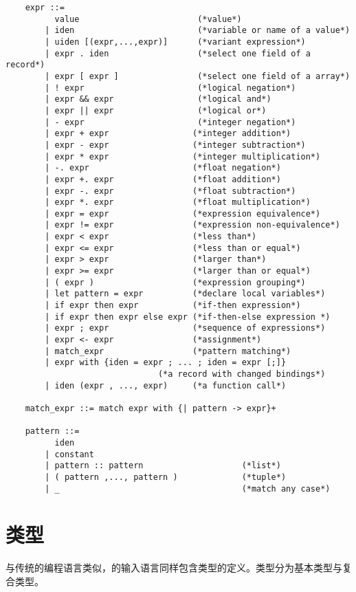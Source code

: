 \begin{center}
	\begin{verbatim}
	expr ::=
	      value                        (*value*)
	    | iden                         (*variable or name of a value*)
	    | uiden [(expr,...,expr)]      (*variant expression*)
	    | expr . iden                  (*select one field of a record*)
	    | expr [ expr ]                (*select one field of a array*)
	    | ! expr                       (*logical negation*)
	    | expr && expr                 (*logical and*)
	    | expr || expr                 (*logical or*)
	    | - expr                       (*integer negation*)
	    | expr + expr                 (*integer addition*)
	    | expr - expr                 (*integer subtraction*)
	    | expr * expr                 (*integer multiplication*)
	    | -. expr                     (*float negation*)
	    | expr +. expr                (*float addition*)
	    | expr -. expr                (*float subtraction*)
	    | expr *. expr                (*float multiplication*)
	    | expr = expr                 (*expression equivalence*)
	    | expr != expr                (*expression non-equivalence*)
	    | expr < expr                 (*less than*)
	    | expr <= expr                (*less than or equal*)
	    | expr > expr                 (*larger than*)
	    | expr >= expr                (*larger than or equal*)
	    | ( expr )                    (*expression grouping*)
	    | let pattern = expr          (*declare local variables*)
	    | if expr then expr           (*if-then expression*)
	    | if expr then expr else expr (*if-then-else expression *)
	    | expr ; expr                 (*sequence of expressions*)
	    | expr <- expr                (*assignment*)
	    | match_expr                  (*pattern matching*)
	    | expr with {iden = expr ; ... ; iden = expr [;]}  
	                           (*a record with changed bindings*)
	    | iden (expr , ..., expr)     (*a function call*)
	
	match_expr ::= match expr with {| pattern -> expr}+
	
	pattern ::= 
	      iden 
	    | constant
	    | pattern :: pattern                    (*list*)
	    | ( pattern ,..., pattern )             (*tuple*)
	    | _                                     (*match any case*)
	\end{verbatim}
\end{center}

\section{类型}
与传统的编程语言类似，\sctlprov{}的输入语言同样包含类型的定义。类型分为基本类型与复合类型。
